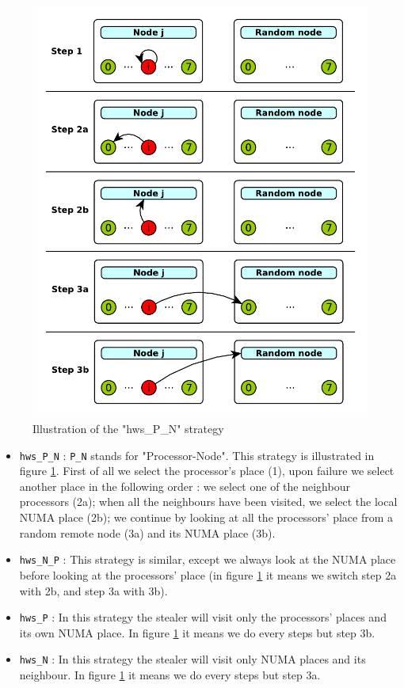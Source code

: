 \documentclass{Styles/llncs}
\begin{document}
\begin{figure}[t]
  \centering
  \includegraphics[scale=0.7]{figures/strategies.pdf}
\caption{Illustration of the "hws\_P\_N" strategy}
\label{fig:detail-strategy}
\end{figure}
\begin{itemize}
  \item \verb/hws_P_N/ : \verb/P_N/ stands for "Processor-Node". This strategy is
    illustrated in figure \ref{fig:detail-strategy}.
    First of all we select the processor's place (1), upon failure we select
    another place in the following order : we select one of the neighbour
    processors (2a); when all the neighbours have been visited, we select the
    local NUMA place (2b); we continue by looking at all the processors' place
    from a random remote node (3a) and its NUMA place (3b).
  \item \verb/hws_N_P/ : This strategy is similar, except we always look at the
    NUMA place before looking at the processors' place (in figure \ref{fig:detail-strategy}
    it means we switch step 2a with 2b, and step 3a with 3b).
  \item \verb/hws_P/ : In this strategy the stealer will visit only the
    processors' places and its own NUMA place. In figure \ref{fig:detail-strategy} it means we do
    every steps but step 3b.
  \item \verb/hws_N/ : In this strategy the stealer will visit only NUMA places
    and its neighbour. In figure \ref{fig:detail-strategy} it means we do
    every steps but step 3a.
\end{itemize}
\end{document}
